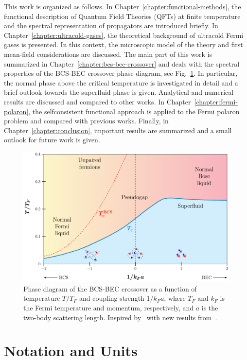 This work is organized as follows. In Chapter~\ref{chapter:functional-methods}, the functional description of Quantum Field Theories (QFTs) at finite temperature and the spectral representation of propagators are introduced briefly. In Chapter~\ref{chapter:ultracold-gases}, the theoretical background of ultracold Fermi gases is presented. In this context, the microscopic model of the theory and first mean-field considerations are discussed. The main part of this work is summarized in Chapter~\ref{chapter:bcs-bec-crossover} and deals with the spectral properties of the BCS-BEC crossover phase diagram, see Fig.~\ref{fig:crossover-phase-diagram}. In particular, the normal phase above the critical temperature is investigated in detail and a brief outlook towards the superfluid phase is given. Analytical and numerical results are discussed and compared to other works. In Chapter~\ref{chapter:fermi-polaron}, the selfconsistent functional approach is applied to the Fermi polaron problem and compared with previous works. Finally, in Chapter~\ref{chapter:conclusion}, important results are summarized and a small outlook for future work is given.


\begin{figure}[h]
\centering
\includegraphics[width=0.75\linewidth]{figs/bcs-bec.pdf}
\caption[Phase diagram of the BCS-BEC crossover]{Phase diagram of the BCS-BEC crossover as a function of temperature $T/T_F$ and coupling strength $1/k_Fa$, where $T_F$ and $k_F$ is the Fermi temperature and momentum, respectively, and $a$ is the two-body scattering length. Inspired by~\cite{Randeria2014} with new results from~\cite{Haussmann2007}.}
\label{fig:crossover-phase-diagram}
\end{figure}


\section*{Notation and Units}

